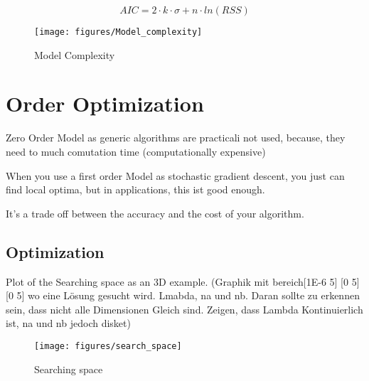  \begin{equation}
	AIC = 2 \cdot k \cdot \sigma + n \cdot ln(RSS)
	\label{eq:aic_rms_adapt}
\end{equation}

\begin{figure}[!htb]
    \centering
    \texttt{[image: figures/Model\_complexity]} %
    \caption[2D Example Least Square vs. Gruop LASSO]{Model Complexity}
    \label{fig:model_complexity}
\end{figure}




\section{Order Optimization}
\label{sec:order_opt}

Zero Order Model as generic algorithms are practicali not used, because, they need to much comutation time (computationally expensive)

When you use a first order Model as stochastic gradient descent, you just can find local optima, but in applications, this ist good enough.

It's a trade off between the accuracy and the cost of your algorithm.

\subsection{Optimization}
\label{sec:optimization}

Plot of the Searching space as an 3D example. (Graphik mit bereich[1E-6 5] [0 5] [0 5] wo eine Lösung gesucht wird. Lmabda, na und nb. Daran sollte zu erkennen sein, dass nicht alle Dimensionen Gleich sind. Zeigen, dass Lambda Kontinuierlich ist, na und nb jedoch disket)

\begin{figure}[!htb]
    \centering
    \texttt{[image: figures/search\_space]} %
    \caption[Scheme of particle swarm optimization]{Searching space}
    \label{fig:flowchart}
\end{figure}


